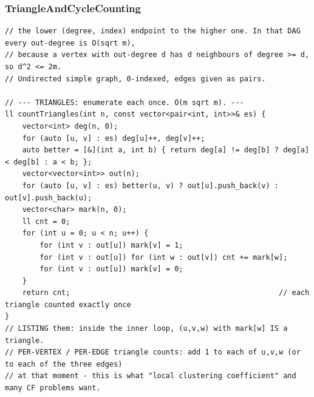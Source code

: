 \documentclass[9pt,a4paper,twocolumn]{extarticle}
\begin{document}
\filbreak
\subsubsection{TriangleAndCycleCounting}
\nopagebreak
\begin{lstlisting}
// the lower (degree, index) endpoint to the higher one. In that DAG every out-degree is O(sqrt m),
// because a vertex with out-degree d has d neighbours of degree >= d, so d^2 <= 2m.
// Undirected simple graph, 0-indexed, edges given as pairs.

// --- TRIANGLES: enumerate each once. O(m sqrt m). ---
ll countTriangles(int n, const vector<pair<int, int>>& es) {
    vector<int> deg(n, 0);
    for (auto [u, v] : es) deg[u]++, deg[v]++;
    auto better = [&](int a, int b) { return deg[a] != deg[b] ? deg[a] < deg[b] : a < b; };
    vector<vector<int>> out(n);
    for (auto [u, v] : es) better(u, v) ? out[u].push_back(v) : out[v].push_back(u);
    vector<char> mark(n, 0);
    ll cnt = 0;
    for (int u = 0; u < n; u++) {
        for (int v : out[u]) mark[v] = 1;
        for (int v : out[u]) for (int w : out[v]) cnt += mark[w];
        for (int v : out[u]) mark[v] = 0;
    }
    return cnt;                                                // each triangle counted exactly once
}
// LISTING them: inside the inner loop, (u,v,w) with mark[w] IS a triangle.
// PER-VERTEX / PER-EDGE triangle counts: add 1 to each of u,v,w (or to each of the three edges)
// at that moment - this is what "local clustering coefficient" and many CF problems want.


\end{lstlisting}
\end{document}
